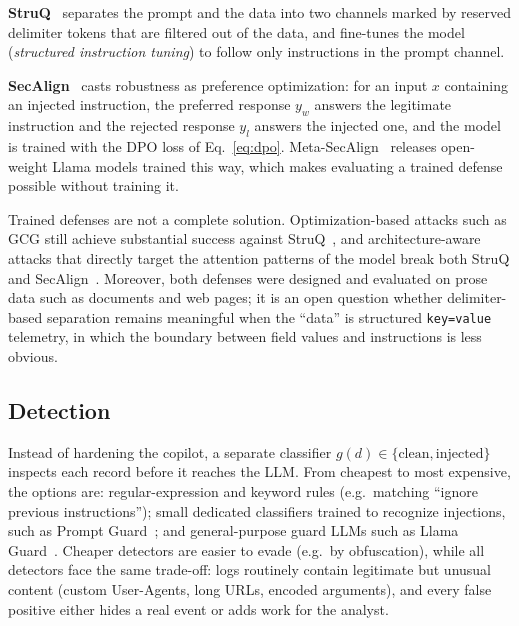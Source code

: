 \textbf{StruQ}~\cite{chen2025struq} separates the prompt and the data into two channels marked by reserved delimiter tokens that are filtered out of the data, and fine-tunes the model (\emph{structured instruction tuning}) to follow only instructions in the prompt channel.

\textbf{SecAlign}~\cite{chen2025secalign} casts robustness as preference optimization: for an input $x$ containing an injected instruction, the preferred response $y_w$ answers the legitimate instruction and the rejected response $y_l$ answers the injected one, and the model is trained with the DPO loss of Eq.~\eqref{eq:dpo}. Meta-SecAlign~\cite{chen2025metasecalign} releases open-weight Llama models trained this way, which makes evaluating a trained defense possible without training it.

Trained defenses are not a complete solution. Optimization-based attacks such as GCG still achieve substantial success against StruQ~\cite{chen2025struq}, and architecture-aware attacks that directly target the attention patterns of the model break both StruQ and SecAlign~\cite{pandya2025astra}. Moreover, both defenses were designed and evaluated on prose data such as documents and web pages; it is an open question whether delimiter-based separation remains meaningful when the ``data'' is structured \texttt{key=value} telemetry, in which the boundary between field values and instructions is less obvious.

\subsection{Detection}
\label{sec:def-detect}

Instead of hardening the copilot, a separate classifier $g(d) \in \{\text{clean}, \text{injected}\}$ inspects each record before it reaches the LLM. From cheapest to most expensive, the options are: regular-expression and keyword rules (e.g.\ matching ``ignore previous instructions''); small dedicated classifiers trained to recognize injections, such as Prompt Guard~\cite{meta2024promptguard}; and general-purpose guard LLMs such as Llama Guard~\cite{inan2023llamaguard}. Cheaper detectors are easier to evade (e.g.\ by obfuscation), while all detectors face the same trade-off: logs routinely contain legitimate but unusual content (custom User-Agents, long URLs, encoded arguments), and every false positive either hides a real event or adds work for the analyst.
